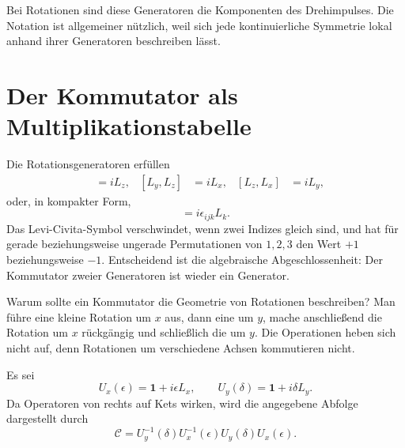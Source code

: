 Bei Rotationen sind diese Generatoren die Komponenten des Drehimpulses. Die Notation ist allgemeiner nützlich, weil sich jede kontinuierliche Symmetrie lokal anhand ihrer Generatoren beschreiben lässt.

\section{Der Kommutator als Multiplikationstabelle}

Die Rotationsgeneratoren erfüllen
\begin{align}
[L_x,L_y]&=iL_z,&
[L_y,L_z]&=iL_x,&
[L_z,L_x]&=iL_y,
\end{align}
oder, in kompakter Form,
\begin{equation}
[L_i,L_j]=i\epsilon_{ijk}L_k.
\end{equation}
Das Levi-Civita-Symbol verschwindet, wenn zwei Indizes gleich sind, und hat für gerade beziehungsweise ungerade Permutationen von \(1,2,3\) den Wert \(+1\) beziehungsweise \(-1\). Entscheidend ist die algebraische Abgeschlossenheit: Der Kommutator zweier Generatoren ist wieder ein Generator.

Warum sollte ein Kommutator die Geometrie von Rotationen beschreiben? Man führe eine kleine Rotation um \(x\) aus, dann eine um \(y\), mache anschließend die Rotation um \(x\) rückgängig und schließlich die um \(y\). Die Operationen heben sich nicht auf, denn Rotationen um verschiedene Achsen kommutieren nicht.

\begin{classroomqa}
\end{classroomqa}

Es sei
\begin{equation}
U_x(\epsilon)=\mathbf 1+i\epsilon L_x,
\qquad
U_y(\delta)=\mathbf 1+i\delta L_y.
\end{equation}
Da Operatoren von rechts auf Kets wirken, wird die angegebene Abfolge dargestellt durch
\begin{equation}
\mathcal C
=U_y^{-1}(\delta)U_x^{-1}(\epsilon)
 U_y(\delta)U_x(\epsilon).
\end{equation}

